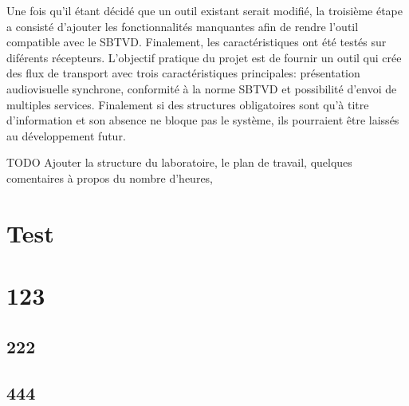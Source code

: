 \documentclass[12pt,a4paper]{article}
\begin{document}
Une fois qu'il étant décidé que un outil existant serait modifié, la troisième étape a consisté d'ajouter les fonctionnalités manquantes afin de rendre l'outil compatible avec le SBTVD. Finalement, les caractéristiques ont été testés sur diférents récepteurs. L'objectif pratique du projet est de fournir un outil qui crée des flux de transport avec trois caractéristiques principales: présentation audiovisuelle synchrone, conformité à la norme SBTVD et possibilité d'envoi de multiples services. Finalement si des structures obligatoires sont qu'à titre d'information et son absence ne bloque pas le système, ils pourraient être laissés au développement futur.

TODO Ajouter la structure du laboratoire, le plan de travail, quelques comentaires à propos du nombre d'heures,



\appendix
\section{Test}
\newpage
{}
\section{123}
\subsection{222}
\subsection{444}

\newpage
 \TBglossary

\TBcoverpage
\end{document}
